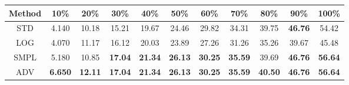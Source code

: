 \documentclass{standalone}
\begin{document}
\begin{tabular}{c|cccccccccc}
      \toprule
      Method & 10\% & 20\% & 30\% & 40\% & 50\% & 60\% & 70\% & 80\% & 90\% & 100\% \\
      \midrule
STD & 4.140 & 10.18 & 15.21 & 19.67 & 24.46 & 29.82 & 34.31 & 39.75 & \textbf{46.76} & 54.42\\
LOG & 4.070 & 11.17 & 16.12 & 20.03 & 23.89 & 27.26 & 31.26 & 35.26 & 39.67 & 45.48\\
SMPL & 5.180 & 10.85 & \textbf{17.04} & \textbf{21.34} & \textbf{26.13} & \textbf{30.25} & \textbf{35.59} & 39.69 & \textbf{46.76} & \textbf{56.64}\\
ADV & \textbf{6.650} & \textbf{12.11} & \textbf{17.04} & \textbf{21.34} & \textbf{26.13} & \textbf{30.25} & \textbf{35.59} & \textbf{40.50} & \textbf{46.76} & \textbf{56.64}\\
  \bottomrule
\end{tabular}
\end{document}
